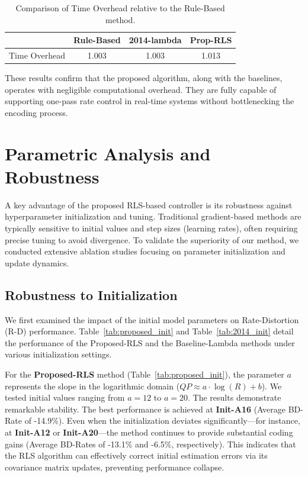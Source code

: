 \begin{table}[htbp]
    \centering
    \caption{Comparison of Time Overhead relative to the Rule-Based method.}
    \label{tab:time_overhead}
    
    \begin{tabular}{lccc}
        \toprule
         & \textbf{Rule-Based} & \textbf{2014-lambda} & \textbf{Prop-RLS} \\
        \midrule
        Time Overhead & 1.003 & 1.003 & 1.013 \\
        \bottomrule
    \end{tabular}
\end{table}

These results confirm that the proposed algorithm, along with the baselines, operates with negligible computational overhead. They are fully capable of supporting one-pass rate control in real-time systems without bottlenecking the encoding process.



\section{Parametric Analysis and Robustness}

A key advantage of the proposed RLS-based controller is its robustness against hyperparameter initialization and tuning. Traditional gradient-based methods are typically sensitive to initial values and step sizes (learning rates), often requiring precise tuning to avoid divergence. To validate the superiority of our method, we conducted extensive ablation studies focusing on parameter initialization and update dynamics.

\subsection{Robustness to Initialization}

We first examined the impact of the initial model parameters on Rate-Distortion (R-D) performance. Table~\ref{tab:proposed_init} and Table~\ref{tab:2014_init} detail the performance of the Proposed-RLS and the Baseline-Lambda methods under various initialization settings.

For the \textbf{Proposed-RLS} method (Table~\ref{tab:proposed_init}), the parameter $a$ represents the slope in the logarithmic domain ($QP \approx a \cdot \log(R) + b$). We tested initial values ranging from $a=12$ to $a=20$. The results demonstrate remarkable stability. The best performance is achieved at \textbf{Init-A16} (Average BD-Rate of -14.9\%). Even when the initialization deviates significantly—for instance, at \textbf{Init-A12} or \textbf{Init-A20}—the method continues to provide substantial coding gains (Average BD-Rates of -13.1\% and -6.5\%, respectively). This indicates that the RLS algorithm can effectively correct initial estimation errors via its covariance matrix updates, preventing performance collapse.

